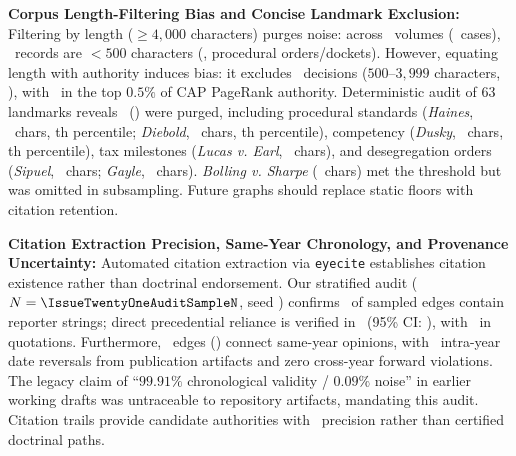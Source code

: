 \item \textbf{Corpus Length-Filtering Bias and Concise Landmark Exclusion:}
Filtering by length ($\ge 4{,}000$ characters) purges noise: across \IssueTwentyTotalVolumesScanned\ volumes (\IssueTwentyTotalDecisionsScanned\ cases), \IssueTwentySubFiveHundredCharCount\ records are $<500$ characters (\IssueTwentySubFiveHundredCharPct, procedural orders/dockets). However, equating length with authority induces bias: it excludes \IssueTwentyIntermediateExcludedCount\ decisions ($500$--$3{,}999$ characters, \IssueTwentyIntermediateExcludedPct), with \IssueTwentyIntermediatePageRankGeNinetyNineFive\ in the top $0.5\%$ of CAP PageRank authority. Deterministic audit of 63 landmarks reveals \IssueTwentyLandmarksExcludedByLength\ (\IssueTwentyLandmarksExcludedByLengthPct) were purged, including procedural standards (\textit{Haines}, \IssueTwentyHainesCharCount\ chars, \IssueTwentyHainesCAPPRPercentile th percentile; \textit{Diebold}, \IssueTwentyDieboldCharCount\ chars, \IssueTwentyDieboldCAPPRPercentile th percentile), competency (\textit{Dusky}, \IssueTwentyDuskyCharCount\ chars, \IssueTwentyDuskyCAPPRPercentile th percentile), tax milestones (\textit{Lucas v. Earl}, \IssueTwentyLucasCharCount\ chars), and desegregation orders (\textit{Sipuel}, \IssueTwentySipuelCharCount\ chars; \textit{Gayle}, \IssueTwentyGayleCharCount\ chars). \textit{Bolling v. Sharpe} (\IssueTwentyBollingCharCount\ chars) met the threshold but was omitted in subsampling. Future graphs should replace static floors with citation retention.

\item \textbf{Citation Extraction Precision, Same-Year Chronology, and Provenance Uncertainty:}
Automated citation extraction via \texttt{eyecite} establishes citation existence rather than doctrinal endorsement. Our stratified audit ($N=\IssueTwentyOneAuditSampleN$, seed \IssueTwentyOneAuditSeed) confirms \IssueTwentyOneAuditCitationPresentPct\ of sampled edges contain reporter strings; direct precedential reliance is verified in \IssueTwentyOneAuditTargetConfirmedPct\ (95\% CI: \IssueTwentyOneAuditTargetConfirmedCI), with \IssueTwentyOneAuditQuotationPct\ in quotations. Furthermore, \IssueTwentyOneSameYearEdges\ edges (\IssueTwentyOneSameYearEdgesPct) connect same-year opinions, with \IssueTwentyOneIntraYearReversals\ intra-year date reversals from publication artifacts and zero cross-year forward violations. The legacy claim of ``$99.91\%$ chronological validity / $0.09\%$ noise'' in earlier working drafts was untraceable to repository artifacts, mandating this audit. Citation trails provide candidate authorities with \IssueTwentyOneAuditTargetConfirmedPct\ precision rather than certified doctrinal paths.


